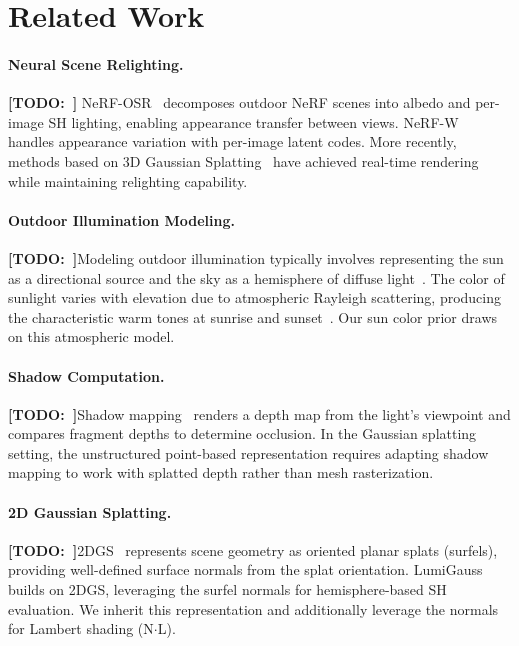 \documentclass[conference]{IEEEtran}
\newcommand{\todo}[1]{{\color{red}\textbf{[TODO:~#1]}}}
\begin{document}
\section{Related Work}
\label{sec:related}

\paragraph{Neural Scene Relighting.}
\todo{}
NeRF-OSR~\cite{rudnev2022nerfOSR} decomposes outdoor NeRF scenes into albedo and per-image SH lighting, enabling appearance transfer between views.
NeRF-W~\cite{martinbrualla2021nerfw} handles appearance variation with per-image latent codes.
More recently, methods based on 3D Gaussian Splatting~\cite{kerbl20233dgs} have achieved real-time rendering while maintaining relighting capability.

\paragraph{Outdoor Illumination Modeling.}
\todo{}Modeling outdoor illumination typically involves representing the sun as a directional source and the sky as a hemisphere of diffuse light~\cite{lalonde2012estimating,hold-geoffroy2019deep}.
The color of sunlight varies with elevation due to atmospheric Rayleigh scattering, producing the characteristic warm tones at sunrise and sunset~\cite{preetham1999practical,nishita1993display}.
Our sun color prior draws on this atmospheric model.

\paragraph{Shadow Computation.}
\todo{}Shadow mapping~\cite{williams1978casting} renders a depth map from the light's viewpoint and compares fragment depths to determine occlusion.
In the Gaussian splatting setting, the unstructured point-based representation requires adapting shadow mapping to work with splatted depth rather than mesh rasterization.

\paragraph{2D Gaussian Splatting.}
\todo{}2DGS~\cite{huang20242dgs} represents scene geometry as oriented planar splats (surfels), providing well-defined surface normals from the splat orientation.
LumiGauss~\cite{joaxkal2024lumigauss} builds on 2DGS, leveraging the surfel normals for hemisphere-based SH evaluation.
We inherit this representation and additionally leverage the normals for Lambert shading (N$\cdot$L).
\end{document}
